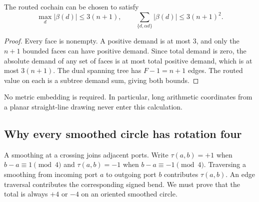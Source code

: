 \begin{lemma}
The routed cochain can be chosen to satisfy
\[
 \max_d|\beta(d)|\leq3(n+1),\qquad
 \sum_{\{d,\alpha d\}}|\beta(d)|\leq3(n+1)^2.
\]
\end{lemma}
\begin{proof}
Every face is nonempty. A positive demand is at most $3$, and only the
$n+1$ bounded faces can have positive demand. Since total demand is zero,
the absolute demand of any set of faces is at most total positive demand,
which is at most $3(n+1)$. The dual spanning tree has $F-1=n+1$ edges.
The routed value on each is a subtree demand sum, giving both bounds.
\end{proof}

No metric embedding is required. In particular, long arithmetic coordinates
from a planar straight-line drawing never enter this calculation.

\subsection{Why every smoothed circle has rotation four}

A smoothing at a crossing joins adjacent ports. Write
$\tau(a,b)=+1$ when $b-a\equiv1\pmod4$ and $\tau(a,b)=-1$ when
$b-a\equiv-1\pmod4$. Traversing a smoothing from incoming port $a$ to
outgoing port $b$ contributes $\tau(a,b)$. An edge traversal contributes
the corresponding signed bend. We must prove that the total is always
$+4$ or $-4$ on an oriented smoothed circle.

